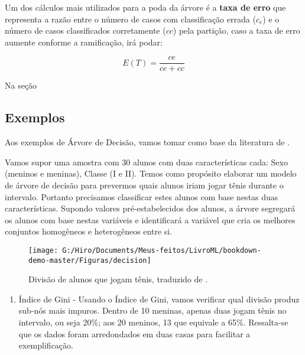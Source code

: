 \documentclass[
  openany]{book}
\providecommand{\tightlist}{%
  \setlength{\itemsep}{0pt}\setlength{\parskip}{0pt}}
\begin{document}
Um dos cálculos mais utilizados para a poda da árvore é a \textbf{taxa de erro} que representa a razão entre o número de casos com classificação errada (\(c_e\)) e o número de casos classificados corretamente (\(cc\)) pela partição, caso a taxa de erro aumente conforme a ramificação, irá podar:

\begin{equation}
E(T)=\frac{ce}{ce+cc}
\label{eq:txerro}
\end{equation}

Na seção

\hypertarget{extree}{%
\subsection{Exemplos}\label{extree}}

Aos exemplos de Árvore de Decisão, vamos tomar como base da literatura de \citep{analytics}.

Vamos supor uma amostra com 30 alunos com duas características cada: Sexo (meninos e meninas), Classe (I e II). Temos como propósito elaborar um modelo de árvore de decisão para prevermos quais alunos iriam jogar tênis durante o intervalo. Portanto precisamos classificar estes alunos com base nestas duas características. Supondo valores pré-estabelecidos dos alunos, a árvore segregará os alunos com base nestas variáveis e identificará a variável que cria os melhores conjuntos homogêneos e heterogêneos entre si.

\begin{figure}

{\centering \texttt{[image: G:/Hiro/Documents/Meus-feitos/LivroML/bookdown-demo-master/Figuras/decision]} 

}

\caption{Divisão de alunos que jogam tênis, traduzido de \citep{analytics}.}\label{fig:decision}
\end{figure}



\begin{enumerate}
\def\labelenumi{\arabic{enumi}.}
\tightlist
\item
  Índice de Gini - Usando o Índice de Gini, vamos verificar qual divisão produz sub-nós mais impuros. Dentro de 10 meninas, apenas duas jogam tênis no intervalo, ou seja 20\%; aos 20 meninos, 13 que equivale a 65\%. Ressalta-se que os dados foram arredondados em duas casas para facilitar a exemplificação.
\end{enumerate}
\end{document}
